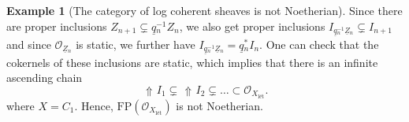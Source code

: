 \documentclass[11pt]{amsart}
\theoremstyle{definition}
\theoremstyle{definition}
\newtheorem{example}[theorem]{Example}
\DeclareMathOperator{\arrowup}{\!\Uparrow \!}
\newcommand{\cO}{\mathcal{O}}
\newcommand{\LogO}[1]{\mathcal{O}_{{#1}_\text{l\'et}}}
\newcommand{\ul}[1]{\underline{#1}}
\newcommand{\cal}{\mathcal}
\def\cO{{\cal O}}
\begin{document}
\begin{example}[The category of log coherent sheaves is not Noetherian]

Since there are proper inclusions $Z_{n+1}\subsetneq \ul{q}{}_n^{-1}Z_n$, we also get proper inclusions $I_{\ul{q}{}_n^{-1}\ul{Z}{}_n}\subsetneq I_{n+1}$ and since $\cO_{\ul{Z}{}_n}$ is static, we further have $I_{\ul{q}{}_n^{-1}\ul{Z}{}_n}=\ul{q}{}_n^*I_n$. One can check that the cokernels of these inclusions are static, which implies that there is an infinite ascending chain $$\arrowup I_1\subsetneq \arrowup I_2\subsetneq \ldots \subset \LogO{X}.$$
where $X=C_1$. Hence, $\text{FP}(\LogO{X})$ is not Noetherian.
\end{example}
\end{document}
